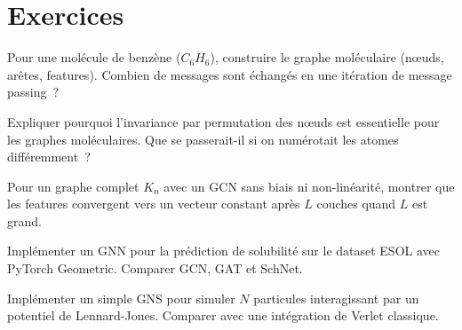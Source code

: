 \section{Exercices}

\begin{exercice}
Pour une mol\'ecule de benz\`ene ($C_6H_6$), construire le graphe
mol\'eculaire (n\oe uds, ar\^etes, features). Combien de messages
sont \'echang\'es en une it\'eration de message passing~?
\end{exercice}

\begin{exercice}
Expliquer pourquoi l'invariance par permutation des n\oe uds
est essentielle pour les graphes mol\'eculaires. Que se
passerait-il si on num\'erotait les atomes diff\'eremment~?
\end{exercice}

\begin{exercice}
Pour un graphe complet $K_n$ avec un GCN sans biais ni
non-lin\'earit\'e, montrer que les features convergent vers
un vecteur constant apr\`es $L$ couches quand $L$ est grand.
\end{exercice}

\begin{exercice}
Impl\'ementer un GNN pour la pr\'ediction de solubilit\'e sur
le dataset ESOL avec PyTorch Geometric. Comparer GCN, GAT et
SchNet.
\end{exercice}

\begin{exercice}[Simulation]
Impl\'ementer un simple GNS pour simuler $N$ particules
interagissant par un potentiel de Lennard-Jones. Comparer
avec une int\'egration de Verlet classique.
\end{exercice}
